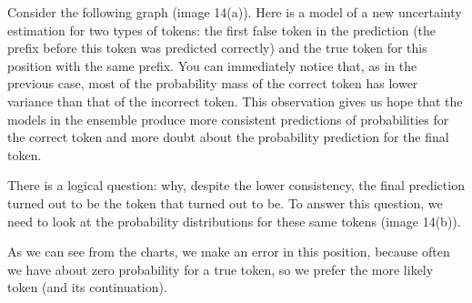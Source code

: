 \documentclass[a4paper,14pt]{extarticle}
\begin{document}
	Consider the following graph (image 14(a)). Here is a model of a new uncertainty estimation for two types of tokens: the first false token in the prediction (the prefix before this token was predicted correctly) and the true token for this position with the same prefix. You can immediately notice that, as in the previous case, most of the probability mass of the correct token has lower variance than that of the incorrect token. This observation gives us hope that the models in the ensemble produce more consistent predictions of probabilities for the correct token and more doubt about the probability prediction for the final token.

	There is a logical question: why, despite the lower consistency, the final prediction turned out to be the token that turned out to be. To answer this question, we need to look at the probability distributions for these same tokens (image 14(b)).
	
	As we can see from the charts, we make an error in this position, because often we have about zero probability for a true token, so we prefer the more likely token (and its continuation).
	
\end{document}

